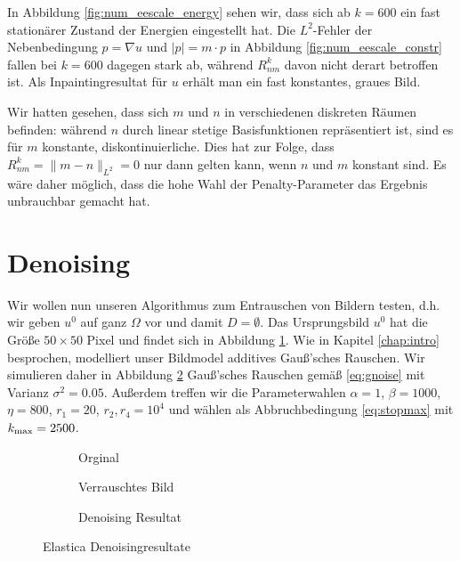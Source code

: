 \documentclass{mythesis}
\begin{document}
In Abbildung \ref{fig:num_eescale_energy} sehen wir, dass sich ab $k = 600$ ein fast stationärer Zustand der Energien eingestellt hat.
Die $L^2$-Fehler der Nebenbedingung $p = \nabla u$ und $|p| = m\cdot p$ in Abbildung \ref{fig:num_eescale_constr} fallen bei $k = 600$ dagegen stark ab, während $R_{nm}^k$ davon nicht derart betroffen ist.
Als Inpaintingresultat für $u$ erhält man ein fast konstantes, graues Bild.

Wir hatten gesehen, dass sich $m$ und $n$ in verschiedenen diskreten Räumen befinden: während $n$ durch linear stetige Basisfunktionen repräsentiert ist, sind es für $m$ konstante, diskontinuierliche.
Dies hat zur Folge, dass $R_{nm}^k = \|m-n\|_{L^2} = 0$ nur dann gelten kann, wenn $n$ und $m$ konstant sind.
Es wäre daher möglich, dass die hohe Wahl der Penalty-Parameter das Ergebnis unbrauchbar gemacht hat.




\section*{Denoising}


Wir wollen nun unseren Algorithmus zum Entrauschen von Bildern testen, d.h. wir geben $u^0$ auf ganz $\Omega$ vor und damit $D = \emptyset$.
Das Ursprungsbild $u^0$ hat die Größe $50\times 50$ Pixel und findet sich in Abbildung \ref{fig:num_denoise_orig}.
Wie in Kapitel \ref{chap:intro} besprochen, modelliert unser Bildmodel additives Gauß'sches Rauschen.
Wir simulieren daher in Abbildung \ref{fig:num_denoise_noise} Gauß'sches Rauschen gemäß \eqref{eq:gnoise} mit Varianz $\sigma^2 = 0.05$.
Außerdem treffen wir die Parameterwahlen $\alpha = 1$, $\beta = 1000$, $\eta = 800$, $r_1 = 20$, $r_2, r_4 = 10^{4}$ und wählen als Abbruchbedingung \eqref{eq:stopmax} mit $k_{\mathrm{max}} = 2500$.

\begin{figure}[ht]
    \centering
    \begin{subfigure}{0.25\textwidth}
	\centering
	\caption{Orginal}
	\label{fig:num_denoise_orig}
    \end{subfigure}%
    \begin{subfigure}{0.25\textwidth}
	\centering
	\caption{Verrauschtes Bild}
	\label{fig:num_denoise_noise}
    \end{subfigure}%
    \begin{subfigure}{0.25\textwidth}
	\centering
	\caption{Denoising Resultat}
	\label{fig:num_denoise_result}
    \end{subfigure}%
    \caption{Elastica Denoisingresultate}
    \label{fig:num_denoise_png}
\end{figure}
\end{document}
